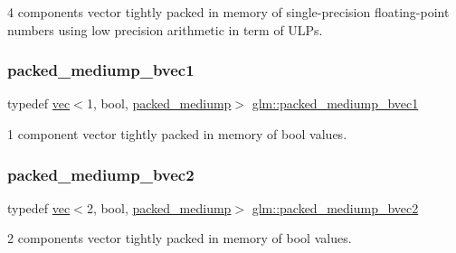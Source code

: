 4 components vector tightly packed in memory of single-\/precision floating-\/point numbers using low precision arithmetic in term of U\+L\+Ps. 

\mbox{\label{group__gtc__type__aligned_ga1dd6d3757af9269de00ba70b0f65a648}} 
\subsubsection{\texorpdfstring{packed\+\_\+mediump\+\_\+bvec1}{packed\_mediump\_bvec1}}
{\footnotesize\ttfamily typedef \hyperlink{structglm_1_1vec}{vec}$<$1, bool, \hyperlink{namespaceglm_a36ed105b07c7746804d7fdc7cc90ff25a9604654c3b137cd7898689fd34b25bc0}{packed\+\_\+mediump}$>$ \hyperlink{group__gtc__type__aligned_ga1dd6d3757af9269de00ba70b0f65a648}{glm\+::packed\+\_\+mediump\+\_\+bvec1}}



1 component vector tightly packed in memory of bool values. 

\mbox{\label{group__gtc__type__aligned_ga5c9715603d1138006760556f02aacad5}} 
\subsubsection{\texorpdfstring{packed\+\_\+mediump\+\_\+bvec2}{packed\_mediump\_bvec2}}
{\footnotesize\ttfamily typedef \hyperlink{structglm_1_1vec}{vec}$<$2, bool, \hyperlink{namespaceglm_a36ed105b07c7746804d7fdc7cc90ff25a9604654c3b137cd7898689fd34b25bc0}{packed\+\_\+mediump}$>$ \hyperlink{group__gtc__type__aligned_ga5c9715603d1138006760556f02aacad5}{glm\+::packed\+\_\+mediump\+\_\+bvec2}}



2 components vector tightly packed in memory of bool values. 

